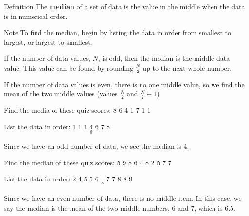 \documentclass{beamer}
\begin{document}
\begin{frame}
\begin{example}
\begin{center}
\begin{tabular}{|c|c||c|c|}
abular}
\end{center}
What is the mean of this data?\pause
\begin{equation*}
\begin{aligned}
&\dfrac{\overbrace{15+\cdots+15}^{\text{6 terms}}+\overbrace{20+\cdots+20}^{\text{8 terms}}+\overbrace{25+\cdots+25}^{\text{11 terms}}+\cdots+\overbrace{50+\cdots+50}^{\text{7 terms}}}{100} \\
=&\dfrac{15\cdot 6+20\cdot 8+25\cdot 11+30\cdot 17+35\cdot 19+40\cdot 20+45\cdot 12+50\cdot 7}{100} \\
=& \dfrac{3390}{100} = 33.9
\end{aligned}
\end{equation*}
\end{example}
\end{frame}

\begin{frame}
\begin{block}{Definition}
The \textbf{median} of a set of data is the value in the middle when the data is in numerical order.
\end{block}\pause

\begin{block}{Note}
To find the median, begin by listing the data in order from smallest to largest, or largest to smallest.

\vspace{2mm}
If the number of data values, $N$, is odd, then the median is the middle data value. This value can be found by rounding $\frac{N}{2}$ up to the next whole number.

\vspace{2mm}
If the number of data values is even, there is no one middle value, so we find the mean
of the two middle values (values $\frac{N}{2}$ and $\frac{N}{2} + 1$)
\end{block}
\end{frame}

\begin{frame}
\begin{example}
Find the media of these quiz scores: 8 6 4 1 7 1 1\pause

\vspace{2mm}
List the data in order: 1 1 1 $\underset{\Uparrow}{4}$ 6 7 8

\vspace{2mm}
Since we have an odd number of data, we see the median is 4.
\end{example}\pause

\begin{example}
Find the median of these quiz scores: 5 9 8 6 4 8 2 5 7 7\pause

\vspace{2mm}
List the data in order: 2 4 5 5 6 $\underset{\Uparrow}{}$ 7 7 8 8 9

\vspace{2mm}
Since we have an even number of data, there is no middle item. In this case, we say the median is the mean of the two middle numbers, 6 and 7, which is 6.5.
\end{example}
\end{frame}
\end{document}
